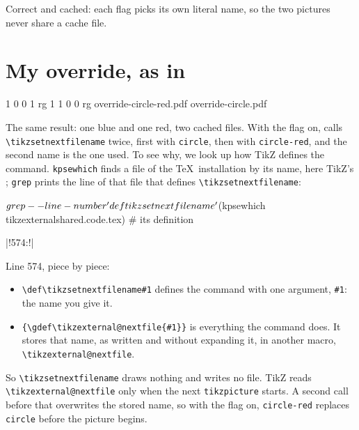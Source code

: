 \documentclass[11pt,a4paper]{article}
\let\lstinputlistingwhole
\renewcommand{}[2][]{\needspace{8\baselineskip}\lstinputlistingwhole[#1]{#2}}
\let\sectionalone\section
\renewcommand{\section}{\needspace{8\baselineskip}\sectionalone}
\newcommand{\cs}[1]{\texttt{\textbackslash #1}}
\begin{document}
Correct and cached: each flag picks its own literal name, so the two pictures never share a cache file.

\section{My override, as in }\label{sec:override}



\begin{cmdout}
   1 0 0 1 rg
   1 1 0 0 rg
override-circle-red.pdf
override-circle.pdf
\end{cmdout}

The same result: one blue and one red, two cached files. With the flag on,  calls \cs{tikzsetnextfilename} twice, first with \texttt{circle}, then with \texttt{circle-red}, and the second name is the one used. To see why, we look up how TikZ defines the command. \texttt{kpsewhich} finds a file of the \TeX\ installation by its name, here TikZ's ; \texttt{grep} prints the line of that file that defines \cs{tikzsetnextfilename}:

\begin{pane}
$ grep --line-number 'def\\tikzsetnextfilename' $(kpsewhich tikzexternalshared.code.tex)   # its definition
\end{pane}
\begin{cmdout}
|!574:\def\tikzsetnextfilename#1{\gdef\tikzexternal@nextfile{#1}}!|
\end{cmdout}

Line 574, piece by piece:
\begin{itemize}[leftmargin=1.2em,itemsep=0pt]
  \item \verb|\def\tikzsetnextfilename#1| defines the command with one argument, \verb|#1|: the name you give it.
  \item \verb|{\gdef\tikzexternal@nextfile{#1}}| is everything the command does. It stores that name, as written and without expanding it, in another macro, \cs{tikzexternal@nextfile}.
\end{itemize}
So \cs{tikzsetnextfilename} draws nothing and writes no file. TikZ reads \cs{tikzexternal@nextfile} only when the next \texttt{tikzpicture} starts. A second call before that overwrites the stored name, so with the flag on, \texttt{circle-red} replaces \texttt{circle} before the picture begins.
\end{document}
